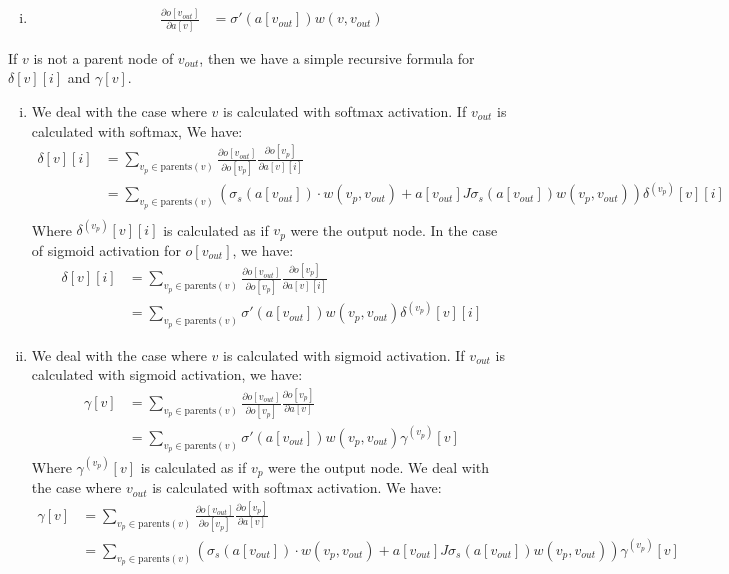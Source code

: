 \documentclass{amsart}
\theoremstyle{definition}
\begin{document}
\begin{enumerate}[(a)]
\begin{enumerate}[i.]
      \item
        \begin{align*}
          \frac{\partial o[v_{out}]}{\partial a[v]} &= \sigma'(a[v_{out}]) w(v, v_{out})
        \end{align*}
    \end{enumerate}
    If $v$ is not a parent node of $v_{out}$, then we have a simple recursive formula for $\delta[v][i]$ and $\gamma[v]$. 
    \begin{enumerate}[i.]
      \item 
        We deal with the case where $v$ is calculated with softmax activation. If $v_{out}$ is calculated with softmax, We have:
        \begin{align*}
          \delta[v][i] &= \sum_{v_p \in \text{parents}(v)} \frac{\partial o[v_{out}]}{\partial o[v_p]} \frac{\partial o[v_p]}{\partial a[v][i]} \\
          &= \sum_{v_p \in \text{parents}(v)} \left(\sigma_s(a[v_{out}]) \cdot w(v_p, v_{out}) + a[v_{out}] J \sigma_s(a[v_{out}]) w(v_p, v_{out})\right) \delta^{(v_p)}[v][i] \\
        \end{align*}
        Where $\delta^{(v_p)}[v][i]$ is calculated as if $v_p$ were the output node. 
        In the case of sigmoid activation for $o[v_{out}]$, we have:
        \begin{align*}
          \delta[v][i] &= \sum_{v_p \in \text{parents}(v)} \frac{\partial o[v_{out}]}{\partial o[v_p]} \frac{\partial o[v_p]}{\partial a[v][i]} \\
          &= \sum_{v_p \in \text{parents}(v)} \sigma'(a[v_{out}]) w(v_p, v_{out}) \delta^{(v_p)}[v][i]
        \end{align*}
      \item
        We deal with the case where $v$ is calculated with sigmoid activation. If $v_{out}$ is calculated with sigmoid activation, we have:
        \begin{align*}
          \gamma[v] &= \sum_{v_p \in \text{parents}(v)} \frac{\partial o[v_{out}]}{\partial o[v_p]} \frac{\partial o[v_p]}{\partial a[v]} \\
          &= \sum_{v_p \in \text{parents}(v)} \sigma'(a[v_{out}]) w(v_p, v_{out}) \gamma^{(v_p)}[v]
        \end{align*}
        Where $\gamma^{(v_p)}[v]$ is calculated as if $v_p$ were the output node.
        We deal with the case where $v_{out}$ is calculated with softmax activation. We have:
        \begin{align*}
          \gamma[v] &= \sum_{v_p \in \text{parents}(v)} \frac{\partial o[v_{out}]}{\partial o[v_p]} \frac{\partial o[v_p]}{\partial a[v]} \\
          &= \sum_{v_p \in \text{parents}(v)} \left(\sigma_s(a[v_{out}]) \cdot w(v_p, v_{out}) + a[v_{out}] J \sigma_s(a[v_{out}]) w(v_p, v_{out})\right) \gamma^{(v_p)}[v]
        \end{align*}
      \end{enumerate}
\end{enumerate}
\end{document}
